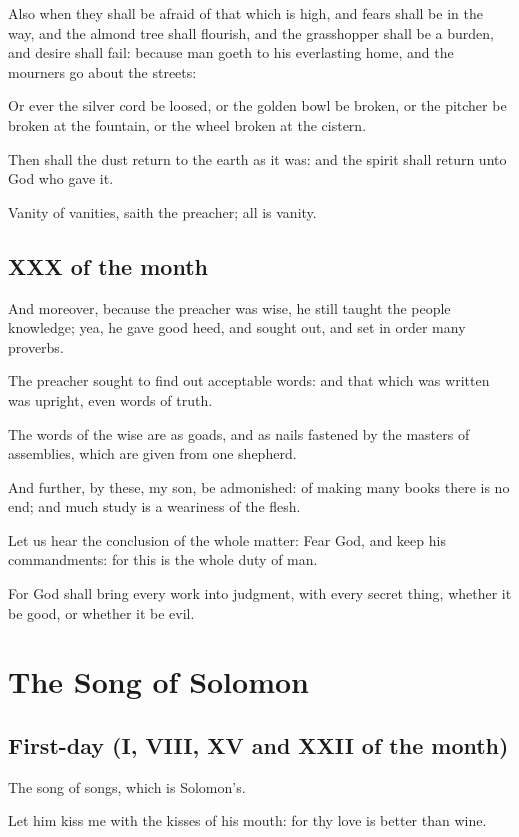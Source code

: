 \documentclass[0main.tex]{subfiles}
\begin{document}
Also when they shall be afraid of that which is high, and fears shall be in the way, and the almond tree shall flourish, and the grasshopper shall be a burden, and desire shall fail: because man goeth to his everlasting home, and the mourners go about the streets:

Or ever the silver cord be loosed, or the golden bowl be broken, or the pitcher be broken at the fountain, or the wheel broken at the cistern.

Then shall the dust return to the earth as it was: and the spirit shall return unto God who gave it.

Vanity of vanities, saith the preacher; all is vanity.

\section*{XXX of the month}

And moreover, because the preacher was wise, he still taught the people knowledge; yea, he gave good heed, and sought out, and set in order many proverbs.

The preacher sought to find out acceptable words: and that which was written was upright, even words of truth.

The words of the wise are as goads, and as nails fastened by the masters of assemblies, which are given from one shepherd.

And further, by these, my son, be admonished: of making many books there is no end; and much study is a weariness of the flesh.

Let us hear the conclusion of the whole matter: Fear God, and keep his commandments: for this is the whole duty of man.

For God shall bring every work into judgment, with every secret thing, whether it be good, or whether it be evil.

\chapter{The Song of Solomon}

\section*{First-day (I, VIII, XV and XXII of the month)}

The song of songs, which is Solomon's.

Let him kiss me with the kisses of his mouth: for thy love is better than wine.
\end{document}
